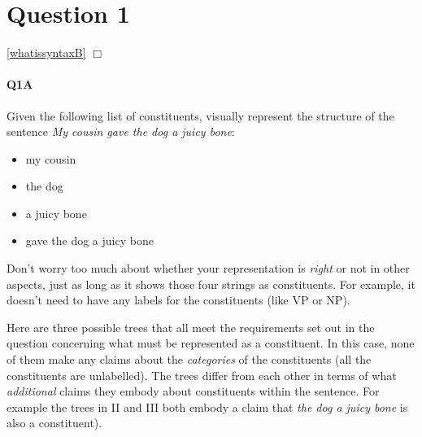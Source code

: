 \documentclass{article}
\begin{document}
\maketitle
\subtitle{Tutorial Notes Week 5: Topics 1, 2 \& 3}

\section*{Question 1}
\hfill{}
\ref{whatissyntaxB} $\Box$

\paragraph{Q1A} Given the following list of constituents, visually represent the structure of the sentence \emph{My cousin gave the dog a juicy bone}:
\begin{itemize}
    \item my cousin
    \item the dog
    \item a juicy bone
    \item gave the dog a juicy bone
\end{itemize}
Don’t worry too much about whether your representation is \emph{right} or not in other aspects, just as long as it
shows those four strings as constituents. For example, it doesn't need to have any labels for the constituents (like VP or NP).

\begin{answer}
{
Here are three possible trees that all meet the requirements set out in the question concerning what must be represented as a constituent. In this case, none of them make any claims about the \emph{categories} of the constituents (all the constituents are unlabelled). The trees differ from each other in terms of what \emph{additional} claims they embody about constituents within the sentence.  For example the trees in II and III both embody a claim that \emph{the dog a juicy bone} is also a constituent).\\
\begin{quote}
\end{quote}
}
\end{answer}
\end{document}
